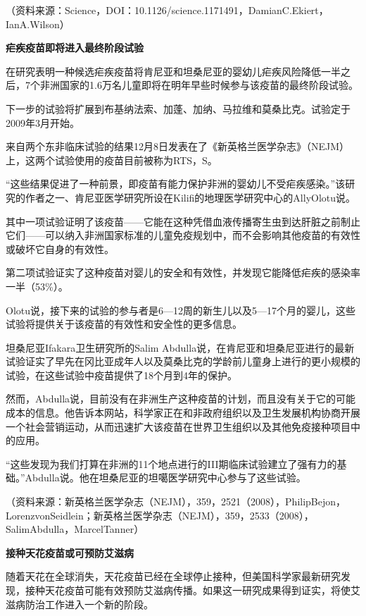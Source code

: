 （资料来源：Science，DOI：10.1126/science.1171491，DamianC.Ekiert，IanA.Wilson）

\begin{center}
 \textbf{\Large 疟疾疫苗即将进入最终阶段试验}
 \end{center}

在研究表明一种候选疟疾疫苗将肯尼亚和坦桑尼亚的婴幼儿疟疾风险降低一半之后，7个非洲国家的1.6万名儿童即将在明年早些时候参与该疫苗的最终阶段试验。

下一步的试验将扩展到布基纳法索、加蓬、加纳、马拉维和莫桑比克。试验定于2009年3月开始。

来自两个东非临床试验的结果12月8日发表在了《新英格兰医学杂志》（NEJM）上，这两个试验使用的疫苗目前被称为RTS，S。

“这些结果促进了一种前景，即疫苗有能力保护非洲的婴幼儿不受疟疾感染。”该研究的作者之一、肯尼亚医学研究所设在Kilifi的地理医学研究中心的AllyOlotu说。

其中一项试验证明了该疫苗------它能在这种凭借血液传播寄生虫到达肝脏之前制止它们------可以纳入非洲国家标准的儿童免疫规划中，而不会影响其他疫苗的有效性或破坏它自身的有效性。

第二项试验证实了这种疫苗对婴儿的安全和有效性，并发现它能降低疟疾的感染率一半（53\%）。

Olotu说，接下来的试验的参与者是6---12周的新生儿以及5---17个月的婴儿，这些试验将提供关于该疫苗的有效性和安全性的更多信息。

坦桑尼亚Ifakara卫生研究所的Salim
Abdulla说，在肯尼亚和坦桑尼亚进行的最新试验证实了早先在冈比亚成年人以及莫桑比克的学龄前儿童身上进行的更小规模的试验，在这些试验中疫苗提供了18个月到4年的保护。

然而，Abdulla说，目前没有在非洲生产这种疫苗的计划，而且没有关于它的可能成本的信息。他告诉本网站，科学家正在和非政府组织以及卫生发展机构协商开展一个社会营销运动，从而迅速扩大该疫苗在世界卫生组织以及其他免疫接种项目中的应用。

“这些发现为我们打算在非洲的11个地点进行的III期临床试验建立了强有力的基础。”Abdulla说。他在坦桑尼亚的坦噶医学研究中心参与了这些试验。

（资料来源：新英格兰医学杂志（NEJM），359，2521（2008），PhilipBejon，LorenzvonSeidlein；新英格兰医学杂志（NEJM），359，2533（2008），SalimAbdulla，MarcelTanner）

\begin{center}
 \textbf{\Large 接种天花疫苗或可预防艾滋病}
 \end{center}

随着天花在全球消失，天花疫苗已经在全球停止接种，但美国科学家最新研究发现，接种天花疫苗可能有效预防艾滋病传播。如果这一研究成果得到证实，将使艾滋病防治工作进入一个新的阶段。

